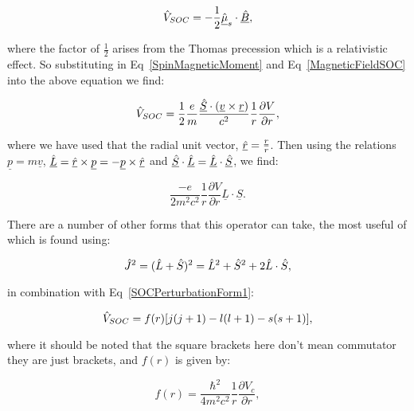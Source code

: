 \begin{equation}
    \Hat{V}_{SOC} = - \frac{1}{2} \underline{\Hat{\mu}}_s \cdot \underline{\Hat{B}},
    \label{SOCPerturbation}
\end{equation}

\noindent where the factor of $\frac{1}{2}$ arises from the Thomas precession which is a relativistic effect. So substituting in Eq~\ref{SpinMagneticMoment} and Eq~\ref{MagneticFieldSOC} into the above equation we find:

\begin{equation}
    \Hat{V}_{SOC} = \frac{1}{2} \frac{e}{m} \frac{\underline{\Hat{S}} \cdot (\underline{v} \times \underline{r})}{c^2} \frac{1}{r} \frac{\partial V}{\partial r},
\end{equation}

\noindent where we have used that the radial unit vector, $\underline{\Hat{r}} = \frac{\underline{r}}{r}$. Then using the relations $\underline{p} = m \underline{v}$, $\underline{\Hat{L}} = \underline{\Hat{r}} \times \underline{p} = - \underline{p} \times \underline{\Hat{r}}$ and $\underline{\Hat{S}} \cdot \underline{\Hat{L}} = \underline{\Hat{L}} \cdot \underline{\Hat{S}}$, we find:

\begin{equation}
    \frac{-e}{2m^2c^2} \frac{1}{r} \frac{\partial V}{\partial r} \underline{L} \cdot \underline{S}.
    \label{SOCPerturbationForm1}
\end{equation}

\noindent There are a number of other forms that this operator can take, the most useful of which is found using:

\begin{equation}
    \Hat{J}^2 = (\Hat{L} + \Hat{S})^2 = \Hat{L}^2 + \Hat{S}^2 + 2 \Hat{L} \cdot \Hat{S},
    \label{TotalAngularMomentumExpansion}
\end{equation}

\noindent in combination with Eq~\ref{SOCPerturbationForm1}:

\begin{equation}
    \Hat{V}_{SOC} = f(r)[j(j + 1) - l(l + 1) - s(s + 1)],
    \label{SOCPerturbationForm2}
\end{equation}

\noindent where it should be noted that the square brackets here don't mean commutator they are just brackets, and $f(r)$ is given by:

\begin{equation}
    f(r) = \frac{\hbar^2}{4m^2c^2} \frac{1}{r} \frac{\partial V_c}{\partial r},
    \label{f(r)Form}
\end{equation}

